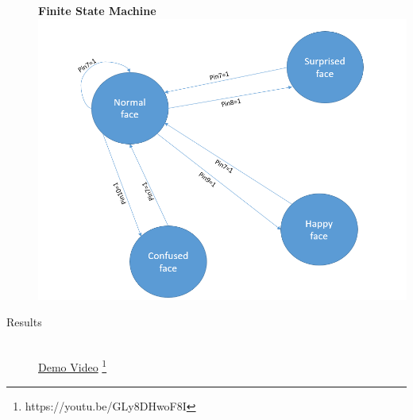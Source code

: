 \documentclass[12pt]{article}
\begin{document}
\begin{description}
		\textbf{Finite State Machine} \\
		\includegraphics[scale=.45]{FSM.PNG} \\
		
	\item[Results] \hfill \\
		
		\href{https://youtu.be/GLy8DHwoF8I}{Demo Video} \footnote{https://youtu.be/GLy8DHwoF8I}
		

\end{description}
\end{document}
